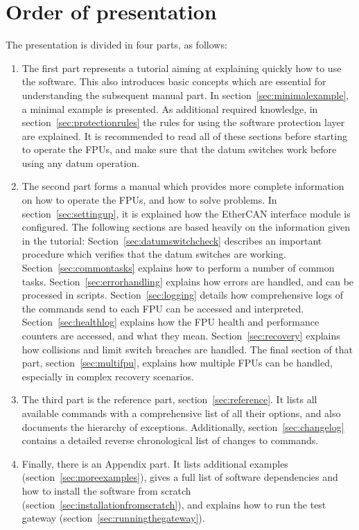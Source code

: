 \documentclass[fontsize=12,a4paper]{scrreprt}
\begin{document}
\section{Order of presentation}
The presentation is divided in four parts, as follows:

\begin{enumerate}
\item The first part represents a tutorial aiming at explaining
  quickly how to use the software. This also introduces basic concepts
  which are essential for understanding the subsequent manual part.
  In section~\ref{sec:minimalexample}, a minimal example is
  presented. As additional required knowledge, in
  section~\ref{sec:protectionrules} the rules for using the software
  protection layer are explained. It is recommended to read all of
  these sections before starting to operate the FPUs, and make sure
  that the datum switches work before using any datum operation.

\item The second part forms a manual which provides more complete
  information on how to operate the FPUs, and how to solve
  problems. In section~\ref{sec:settingup}, it is explained how the
  EtherCAN interface module is configured. The following sections are
  based heavily on the information given in the tutorial:
  Section~\ref{sec:datumswitchcheck} describes an important procedure
  which verifies that the datum switches are working.
  Section~\ref{sec:commontasks} explains how to perform a number of
  common tasks. Section~\ref{sec:errorhandling} explains how errors
  are handled, and can be processed in
  scripts. Section~\ref{sec:logging} details how comprehensive logs of
  the commands send to each FPU can be accessed and
  interpreted. Section~\ref{sec:healthlog} explains how the FPU health
  and performance counters are accessed, and what they mean.
  Section~\ref{sec:recovery} explains how collisions and limit switch
  breaches are handled. The final section of that part,
  section~\ref{sec:multifpu}, explains how multiple FPUs can be
  handled, especially in complex recovery scenarios.

\item The third part is the reference part, section~\ref{sec:reference}.
It lists all available commands with a comprehensive list of all their
options, and also documents the hierarchy of exceptions.
Additionally, section~\ref{sec:changelog} contains a detailed reverse
chronological list of changes to commands.

\item Finally, there is an Appendix part. It lists additional examples
  (section~\ref{sec:moreexamples}), gives a full list of software
  dependencies and how to install the software from scratch
  (section~\ref{sec:installationfromscratch}), and explains how to run
  the test gateway (section~\ref{sec:runningthegateway}).
\end{enumerate}
\end{document}
